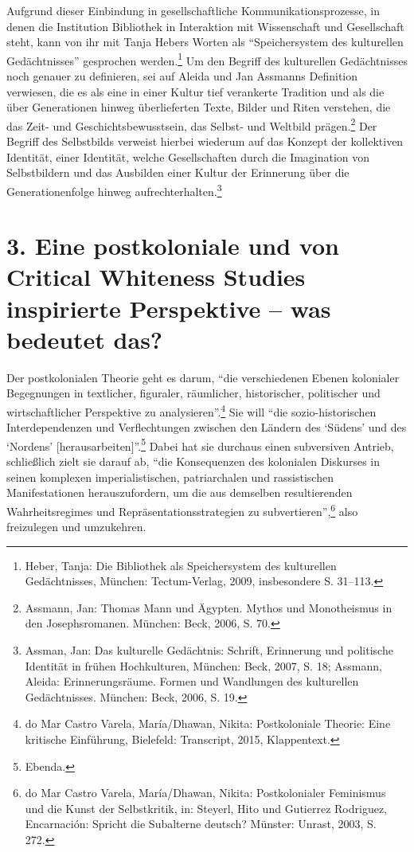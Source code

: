 \documentclass[a4paper,
fontsize=11pt,
oneside,
numbers=noperiodatend,
parskip=half-,
bibliography=totoc,
final
]{scrartcl}
\begin{document}
Aufgrund dieser Einbindung in gesellschaftliche Kommunikationsprozesse,
in denen die Institution Bibliothek in Interaktion mit Wissenschaft und
Gesellschaft steht, kann von ihr mit Tanja Hebers Worten als
\enquote{Speichersystem des kulturellen Gedächtnisses} gesprochen
werden.\footnote{Heber, Tanja: Die Bibliothek als Speichersystem des
  kulturellen Gedächtnisses, München: Tectum-Verlag, 2009, insbesondere
  S. 31--113.} Um den Begriff des kulturellen Gedächtnisses noch genauer
zu definieren, sei auf Aleida und Jan Assmanns Definition verwiesen, die
es als eine in einer Kultur tief verankerte Tradition und als die über
Generationen hinweg überlieferten Texte, Bilder und Riten verstehen, die
das Zeit- und Geschichtsbewusstsein, das Selbst- und Weltbild
prägen.\footnote{Assmann, Jan: Thomas Mann und Ägypten. Mythos und
  Monotheismus in den Josephsromanen. München: Beck, 2006, S. 70.} Der
Begriff des Selbstbilds verweist hierbei wiederum auf das Konzept der
kollektiven Identität, einer Identität, welche Gesellschaften durch die
Imagination von Selbstbildern und das Ausbilden einer Kultur der
Erinnerung über die Generationenfolge hinweg
aufrechterhalten.\footnote{Assman, Jan: Das kulturelle Gedächtnis:
  Schrift, Erinnerung und politische Identität in frühen Hochkulturen,
  München: Beck, 2007, S. 18; Assmann, Aleida: Erinnerungsräume. Formen
  und Wandlungen des kulturellen Gedächtnisses. München: Beck, 2006, S.
  19.}

\hypertarget{eine-postkoloniale-und-von-critical-whiteness-studies-inspirierte-perspektive-was-bedeutet-das}{%
\section{3. Eine postkoloniale und von Critical Whiteness Studies
inspirierte Perspektive -- was bedeutet
das?}\label{eine-postkoloniale-und-von-critical-whiteness-studies-inspirierte-perspektive-was-bedeutet-das}}

Der postkolonialen Theorie geht es darum, \enquote{die verschiedenen
Ebenen kolonialer Begegnungen in textlicher, figuraler, räumlicher,
historischer, politischer und wirtschaftlicher Perspektive zu
analysieren}.\footnote{do Mar Castro Varela, María/Dhawan, Nikita:
  Postkoloniale Theorie: Eine kritische Einführung, Bielefeld:
  Transcript, 2015, Klappentext.} Sie will \enquote{die
sozio-historischen Interdependenzen und Verflechtungen zwischen den
Ländern des \enquote*{Südens} und des \enquote*{Nordens}
{[}herausarbeiten{]}}.\footnote{Ebenda.} Dabei hat sie durchaus einen
subversiven Antrieb, schließlich zielt sie darauf ab, \enquote{die
Konsequenzen des kolonialen Diskurses in seinen komplexen
imperialistischen, patriarchalen und rassistischen Manifestationen
herauszufordern, um die aus demselben resultierenden Wahrheitsregimes
und Repräsentationsstrategien zu subvertieren},\footnote{do Mar Castro
  Varela, María/Dhawan, Nikita: Postkolonialer Feminismus und die Kunst
  der Selbstkritik, in: Steyerl, Hito und Gutierrez Rodriguez,
  Encarnación: Spricht die Subalterne deutsch? Münster: Unrast, 2003, S.
  272.} also freizulegen und umzukehren.
\end{document}
